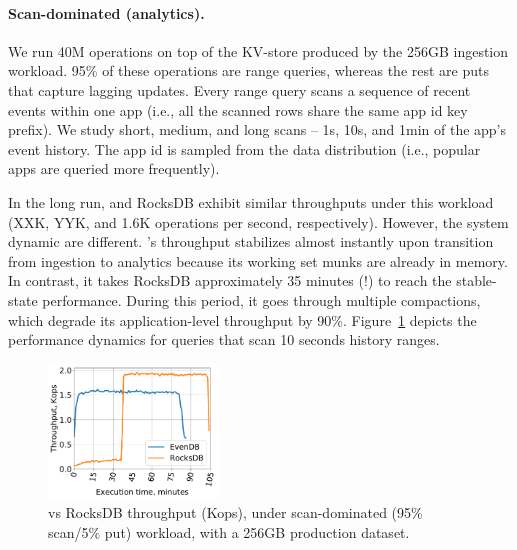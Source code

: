 {\paragraph{Scan-dominated (analytics).} We run 40M operations on top of the KV-store produced by the 256GB 
ingestion workload. 95\% of these operations are range queries, whereas the rest are puts that capture 
lagging updates. Every range query scans a sequence of recent events within one app (i.e., all the scanned rows 
share the same app id key prefix).  We study short, medium, and long scans -- 1s, 10s, and 1min of the app's 
event history. The app id is sampled from the data distribution (i.e., popular apps are queried more frequently).  

In the long run, \sys\/ and RocksDB exhibit similar throughputs under this workload (XXK, YYK, and 1.6K 
operations per second, respectively). However, the system dynamic are different. \sys's throughput stabilizes 
almost instantly upon transition from ingestion to analytics because its working set munks are already in memory. 
In contrast, it takes RocksDB approximately 35 minutes (!) to reach the stable-state performance. During this period, 
it goes through multiple compactions, which degrade its application-level throughput by 90\%. 
Figure~\ref{fig:prod:analytics} depicts the performance dynamics for queries that scan 10 seconds history ranges.}


\begin{figure}[tb]
\includegraphics[width=0.4\textwidth]{figs/throughput_256_scans_10s_line.pdf}
\caption{\sys\/ vs RocksDB throughput (Kops),  under scan-dominated (95\% scan/5\% put) workload, 
with a 256GB production dataset.}
\label{fig:prod:analytics}
\end{figure}

